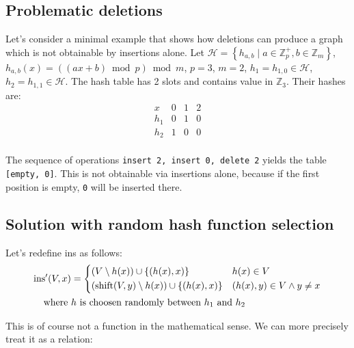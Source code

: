 \documentclass[a4paper, 12pt]{article}
\begin{document}
\subsection{Problematic deletions}

Let's consider a minimal example that shows how deletions can produce a graph which is not obtainable by insertions alone. Let \(\mathcal H = \left\{ h_{a,b} \mid a \in \mathbb Z_{p}^+, b \in \mathbb Z_{m} \right\}\), \(h_{a,b}(x) = ((ax + b) \bmod p) \bmod m\), \(p=3\), \(m=2\), \(h_1 = h_{1,0} \in \mathcal H\), \(h_2 = h_{1,1} \in \mathcal H\). The hash table has 2 slots and contains value in \(\mathbb Z_{3}\). Their hashes are:
\[\begin{array}{r|c|c|c}
  x & 0 & 1 & 2 \\\hline
  h_1 & 0 & 1 & 0 \\\hline
  h_2 & 1 & 0 & 0 \\
\end{array}\]

The sequence of operations \texttt{insert 2, insert 0, delete 2} yields the table \texttt{[empty, 0]}. This is not obtainable via insertions alone, because if the first position is empty, \texttt{0} will be inserted there.

\subsection{Solution with random hash function selection}

Let's redefine ins as follows:
\begin{align*}
    \mathrm{ins'}(V, x) &=
                         \begin{dcases}
                           (V \setminus h(x)) \cup \left\{ (h(x), x) \right\}
                           & h(x) \in V
                           \\
                           (\mathrm{shift}(V, y) \setminus h(x)) \cup \left\{ (h(x), x) \right\}
                           & (h(x), y) \in V \wedge y \neq x
                         \end{dcases}
    \\
    \text{where }&\text{\(h\) is choosen randomly between \(h_1\) and \(h_2\)}
\end{align*}

This is of course not a function in the mathematical sense. We can more precisely treat it as a relation:
\end{document}
